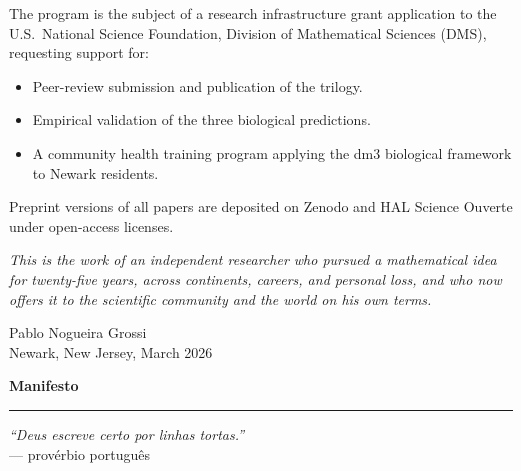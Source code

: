 \documentclass[12pt, oneside]{book}
\theoremstyle{plain}
\theoremstyle{definition}
\theoremstyle{remark}
\begin{document}
The program is the subject of a research infrastructure grant application to
the U.S.\ National Science Foundation, Division of Mathematical Sciences (DMS),
requesting support for:
\begin{itemize}
\item Peer-review submission and publication of the trilogy.
\item Empirical validation of the three biological predictions.
\item A community health training program applying the dm3 biological
      framework to Newark residents.
\end{itemize}
Preprint versions of all papers are deposited on Zenodo and HAL Science
Ouverte under open-access licenses.

\bigskip
\begin{flushright}
\textit{This is the work of an independent researcher who pursued a
mathematical idea for twenty-five years, across continents, careers,
and personal loss, and who now offers it to the scientific community
and the world on his own terms.}

\medskip
Pablo Nogueira Grossi\\
Newark, New Jersey, March 2026
\end{flushright}

\cleardoublepage

\newpage
\thispagestyle{empty}
\vspace*{1.8cm}

\begin{center}
{\large\textbf{Manifesto}}
\end{center}

\vspace{0.5cm}

\begin{center}
\rule{0.5\textwidth}{0.4pt}
\end{center}

\vspace{0.5cm}

\begin{center}
{\large\textit{``Deus escreve certo por linhas tortas.''}}\\[0.4em]
{\small --- provérbio português}
\end{center}

\vspace{0.3cm}
\end{document}
